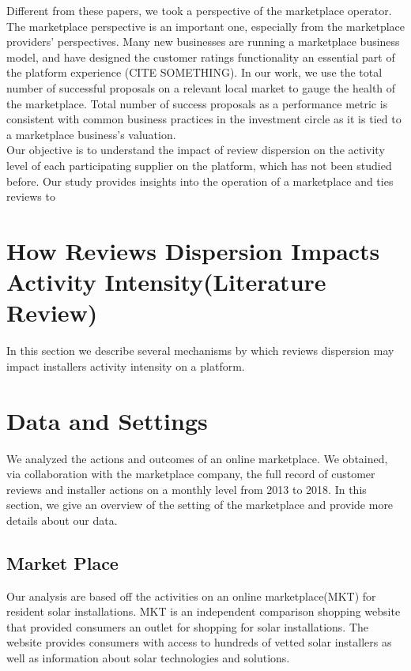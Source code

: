 \documentclass[msom,blindrev]{informs3}
\begin{document}
Different from these papers, we took a perspective of the marketplace operator. The marketplace perspective is an important one, especially from the marketplace providers' perspectives. Many new businesses are running a marketplace business model, and have designed the customer ratings functionality an essential part of the platform experience (CITE SOMETHING). In our work, we use the total number of successful proposals on a relevant local market to gauge the health of the marketplace. Total number of success proposals as a performance metric is consistent with common business practices in the investment circle \citep{boris_2018,galston_2017} as it is tied to a marketplace business's valuation. \\  

Our objective is to understand the impact of review dispersion on the activity level of each participating supplier on the platform, which has not been studied before. Our study provides insights into the operation of a marketplace and ties reviews to 



\section{How Reviews Dispersion Impacts Activity Intensity(Literature Review) }
 In this section we describe several mechanisms by which reviews dispersion may impact installers activity intensity on a platform. 
\section{Data and Settings}
We analyzed the actions and outcomes of an online marketplace. We obtained, via collaboration with the marketplace company, the full record of customer reviews and installer actions on a monthly level from 2013 to 2018. In this section, we give an overview of the setting of the marketplace and provide more details about our data. 
\subsection{Market Place}
Our analysis are based off the activities on an online marketplace(MKT) for resident solar installations. MKT is an independent comparison shopping website that provided consumers an outlet for shopping for solar installations. The website provides consumers with access to hundreds of vetted solar installers as well as information about solar technologies and solutions. 
\end{document}
